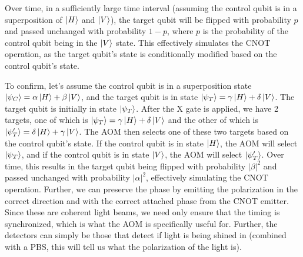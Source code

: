 \documentclass[12pt]{amsart}
\begin{document}
    Over time, in a sufficiently large time interval (assuming the control qubit is in a superposition of $\ket{H}$ and $\ket{V}$), the target qubit will be flipped with probability $p$ and passed unchanged with probability $1-p$, where $p$ is the probability of the control qubit being in the $\ket{V}$ state. This effectively simulates the CNOT operation, as the target qubit's state is conditionally modified based on the control qubit's state.

    To confirm, let's assume the control qubit is in a superposition state $\ket{\psi_C} = \alpha\ket{H} + \beta\ket{V}$, and the target qubit is in state $\ket{\psi_T} = \gamma \ket{H} + \delta \ket{V}$. The target qubit is initially in state $\ket{\psi_T}$. After the X gate is applied, we have 2 targets, one of which is $\ket{\psi_T} = \gamma \ket{H} + \delta \ket{V}$ and the other of which is $\ket{\psi_T'} = \delta \ket{H} + \gamma \ket{V}$. The AOM then selects one of these two targets based on the control qubit's state. If the control qubit is in state $\ket{H}$, the AOM will select $\ket{\psi_T}$, and if the control qubit is in state $\ket{V}$, the AOM will select $\ket{\psi_T'}$. Over time, this results in the target qubit being flipped with probability $|\beta|^2$ and passed unchanged with probability $|\alpha|^2$, effectively simulating the CNOT operation. Further, we can preserve the phase by emitting the polarization in the correct direction and with the correct attached phase from the CNOT emitter. Since these are coherent light beams, we need only ensure that the timing is synchronized, which is what the AOM is specifically useful for. Further, the detectors can simply be those that detect if light is being shined in (combined with a PBS, this will tell us what the polarization of the light is). 
\end{document}
